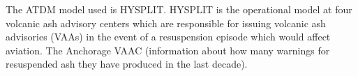 The ATDM model used is HYSPLIT. HYSPLIT is the operational model
at four volcanic ash advisory centers which are responsible for issuing volcanic ash advisories (VAAs) in the event of
a resuspension episode which would affect aviation.
The Anchorage VAAC (information about how many warnings for resuspended ash they have produced in the last decade).






